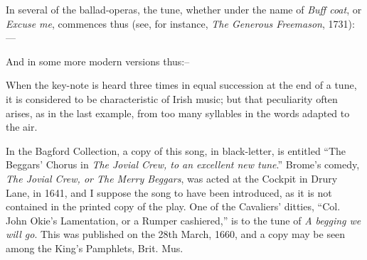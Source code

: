 In several of the ballad-operas, the tune, whether under the name of \textit{Buff
coat}, or \textit{Excuse me}, commences thus (see, for instance, \textit{The Generous Freemason},
1731):—


And in some more modern versions thus:--


When the key-note is heard three times in equal succession at the end of a tune,
it is considered to be characteristic of Irish music; but that peculiarity often arises,
as in the last example, from too many syllables in the words adapted to the air.


In the Bagford Collection, a copy of this song, in black-letter, is entitled “The
Beggars’ Chorus in \textit{The Jovial Crew, to an excellent new tune}.” Brome’s comedy,
\textit{The Jovial Crew, or The Merry Beggars}, was acted at the Cockpit in Drury
Lane, in 1641, and I suppose the song to have been introduced, as it is
not contained in the printed copy of the play. One of the Cavaliers’ ditties,
“Col. John Okie’s Lamentation, or a Rumper cashiered,” is to the tune of
\textit{A begging we will go}. This was published on the 28th March, 1660, and a copy
may be seen among the King’s Pamphlets, Brit. Mus.


